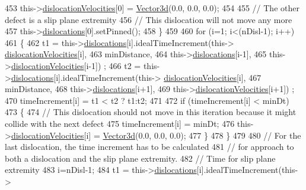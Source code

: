 \begin{DoxyCode}
453        this->\hyperlink{classSlipPlane_a107a3883169bf918664cb4e4fd4bd72c}{dislocationVelocities}[0] = \hyperlink{classVector3d}{Vector3d}(0.0, 0.0, 0.0);
454 
455        \textcolor{comment}{// The other defect is a slip plane extremity}
456        \textcolor{comment}{// This dislocation will not move any more}
457        this->\hyperlink{classSlipPlane_ad92c7c409f7e161db449528389180910}{dislocations}[0].setPinned();
458      \}
459 
460    \textcolor{keywordflow}{for} (i=1; i<(nDisl-1); i++)
461      \{
462        t1 = this->\hyperlink{classSlipPlane_ad92c7c409f7e161db449528389180910}{dislocations}[i].idealTimeIncrement(this->
      \hyperlink{classSlipPlane_a107a3883169bf918664cb4e4fd4bd72c}{dislocationVelocities}[i],
463                                                      minDistance,
464                                                      this->\hyperlink{classSlipPlane_ad92c7c409f7e161db449528389180910}{dislocations}[i-1],
465                                                      this->\hyperlink{classSlipPlane_a107a3883169bf918664cb4e4fd4bd72c}{dislocationVelocities}[i-1])
      ;
466        t2 = this->\hyperlink{classSlipPlane_ad92c7c409f7e161db449528389180910}{dislocations}[i].idealTimeIncrement(this->
      \hyperlink{classSlipPlane_a107a3883169bf918664cb4e4fd4bd72c}{dislocationVelocities}[i],
467                                                      minDistance,
468                                                      this->\hyperlink{classSlipPlane_ad92c7c409f7e161db449528389180910}{dislocations}[i+1],
469                                                      this->\hyperlink{classSlipPlane_a107a3883169bf918664cb4e4fd4bd72c}{dislocationVelocities}[i+1])
      ;
470        timeIncrement[i] = t1 < t2 ? t1:t2;
471 
472        \textcolor{keywordflow}{if} (timeIncrement[i] < minDt)
473          \{
474            \textcolor{comment}{// This dislocation should not move in this iteration because it might collide with the next
       defect}
475            timeIncrement[i] = minDt;
476            this->\hyperlink{classSlipPlane_a107a3883169bf918664cb4e4fd4bd72c}{dislocationVelocities}[i] = \hyperlink{classVector3d}{Vector3d}(0.0, 0.0, 0.0);
477          \}
478      \}
479 
480    \textcolor{comment}{// For the last dislocation, the time increment has to be calculated}
481    \textcolor{comment}{// for approach to both a dislocation and the slip plane extremity.}
482    \textcolor{comment}{// Time for slip plane extremity}
483    i=nDisl-1;
484    t1 = this->\hyperlink{classSlipPlane_ad92c7c409f7e161db449528389180910}{dislocations}[i].idealTimeIncrement(this->

\end{DoxyCode}
